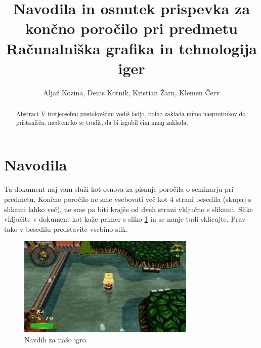\documentclass[a4paper]{article}
\begin{document}
\title{Navodila in osnutek prispevka za končno poročilo pri predmetu Računalniška grafika in tehnologija iger}

\author{Aljaž Kozina, Denis Kotnik, Kristian Žarn, Klemen Červ}



\maketitle


\begin{abstract}{Abstract}
V tretjeosebni pustolovščini vodiš ladjo, polno zaklada mimo nasprotnikov do pristanišča, medtem ko se trudiš, da bi izgubil čim manj zaklada.
\end{abstract}

\section*{Navodila}
Ta dokument naj vam služi kot osnova za pisanje poročila o seminarju pri predmetu. Končno poročilo ne sme vsebovati več kot 4 strani besedila (skupaj s slikami lahko več), ne sme pa biti krajše od dveh strani vključno s slikami. Slike vključite v dokument kot kaže primer s sliko \ref{fig:slika} in se nanje tudi sklicujte. Prav tako v besedilu predstavite vsebino slik.

\begin{figure}[!htb]
    \begin{center}
        \includegraphics[width=\columnwidth]{Overboard.jpg}
        \caption{Navdih za našo igro.} \label{fig:slika}
    \end{center}
\end{figure}
\end{document}

